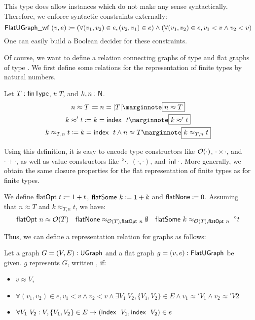 This type does allow instances which do not make any sense syntactically. Therefore, we enforce syntactic constraints externally:
\[\textsf{FlatUGraph\_wf}~(v, e) \coloneqq (\forall (v_1, v_2) \in e, (v_2, v_1) \in e) \land (\forall (v_1, v_2) \in e, v_1 < v \land v_2 < v) \]
One can easily build a Boolean decider for these constraints. 

Of course, we want to define a relation connecting graphs of type \UGraph{} and flat graphs of type \FlatUGraph{}. We first define some relations for the representation of finite types by natural numbers. 

\begin{definition}
  Let $T : \textsf{finType}$, $t : T$, and $k, n : \mathsf{N}$. 
  \begin{gather*}
    n \approx T \defeq n = \length{T} \mnote{$n \approx T$}\\
    k \approx' t \defeq k = \findex~t \mnote{$k \approx' t$}\\
    k \approx_{T, n} t \defeq k = \findex~t \land n \approx T \mnote{$k \approx_{T, n} t$}
  \end{gather*}
\end{definition}

Using this definition, it is easy to encode type constructors like $\mathcal{O}{(\cdot)}$, $\cdot \times \cdot$, and $\cdot + \cdot$, as well as value constructors like $\prescript{\circ}{}\cdot$, $( \cdot, \cdot)$, and $\textsf{inl}~\cdot$. More generally, we obtain the same closure properties for the flat representation of finite types as for finite types.

\begin{example}
  We define $\textsf{flatOpt}~t \coloneqq 1 +{t}$, $\textsf{flatSome}~k \coloneqq 1 +{k}$ and $\textsf{flatNone} \coloneqq 0$. 
  Assuming that $n \approx T$ and $k \approx_{T, n} t$, we have:
  \begin{align*}
  \textsf{flatOpt}~n \approx \mathcal{O}{(T)} \quad \textsf{flatNone} \approx_{\mathcal{O}{(T)}, \textsf{flatOpt}~n} \emptyset \quad \textsf{flatSome}~k \approx_{\mathcal{O}{(T)}, \textsf{flatOpt}~n}~\prescript{\circ}{}t \end{align*}
\end{example}

Thus, we can define a representation relation for graphs as follows: 
\begin{definition}\label{def:graph_repr}
  Let a graph $G = (V, E) : \textsf{UGraph}$ and a flat graph $g = (v, e) : \textsf{FlatUGraph}$ be given. 
  $g$ represents $G$, written , if: 
  \begin{itemize}
    \item $v \approx V$, 
    \item $\forall (v_1, v_2) \in e, v_1 < v \land v_2 < v \land \exists V_1~V_2, \{V_1, V_2\} \in E \land v_1 \approx' V_1 \land v_2 \approx' V2$
    \item $\forall V_1~V_2 : V, \{V_1, V_2\} \in E \rightarrow (\textsf{index}~~V_1, \textsf{index}~~V_2) \in e$
  \end{itemize}
\end{definition}

